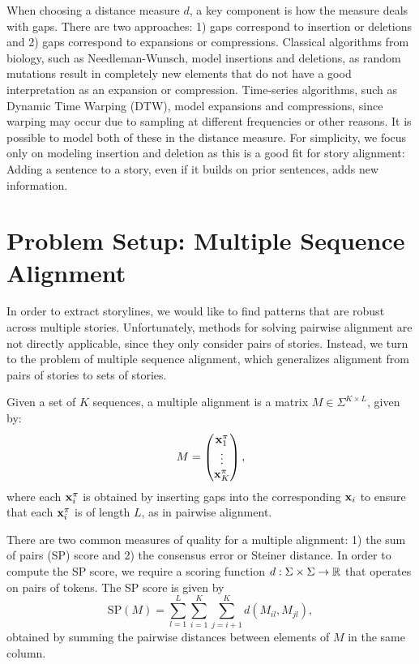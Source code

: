 \documentclass{article}
\begin{document}
When choosing a distance measure $d$, a key component is how the measure deals with gaps.
There are two approaches: 1) gaps correspond to insertion or deletions and 2) gaps
correspond to expansions or compressions.
Classical algorithms from biology, such as Needleman-Wunsch, model insertions and deletions,
as random mutations result in completely new elements that do not have a good interpretation
as an expansion or compression.
Time-series algorithms, such as Dynamic Time Warping (DTW), model expansions and compressions,
since warping may occur due to sampling at different frequencies or other reasons.
It is possible to model both of these in the distance measure.
For simplicity, we focus only on modeling insertion and deletion as this is a good
fit for story alignment:
Adding a sentence to a story, even if it builds on prior sentences,
adds new information.

\section{Problem Setup: Multiple Sequence Alignment}
In order to extract storylines, we would like to find patterns that are robust across
multiple stories. 
Unfortunately, methods for solving pairwise alignment are not directly applicable, since they
only consider pairs of stories.
Instead, we turn to the problem of multiple sequence alignment,
which generalizes alignment from pairs of stories to sets of stories.

Given a set of $K$ sequences,
a multiple alignment is a matrix $M \in \Sigma^{K \times L}$, given by:
\begin{equation}
M = \begin{pmatrix}
    \mathbf{x}_1^\pi \\
    \vdots \\
    \mathbf{x}_K^\pi
\end{pmatrix},
\end{equation}
where each $\mathbf{x}_i^\pi$ is obtained by inserting gaps into the corresponding $\mathbf{x}_i$
to ensure that each $\mathbf{x}_i^\pi$ is of length $L$, as in pairwise alignment.

There are two common measures of quality for a multiple alignment:
1) the sum of pairs (SP) score and 2) the consensus error or Steiner distance.
In order to compute the SP score, we require a scoring function $d: \Sigma\times\Sigma\to\mathbb{R}$
that operates on pairs of tokens.
The SP score is given by
\begin{equation}
\mathrm{SP}(M) = \sum_{l=1}^L \sum_{i=1}^K \sum_{j=i+1}^K d(M_{il}, M_{jl}),
\end{equation}
obtained by summing the pairwise distances between elements of $M$ in the same column.
\end{document}
